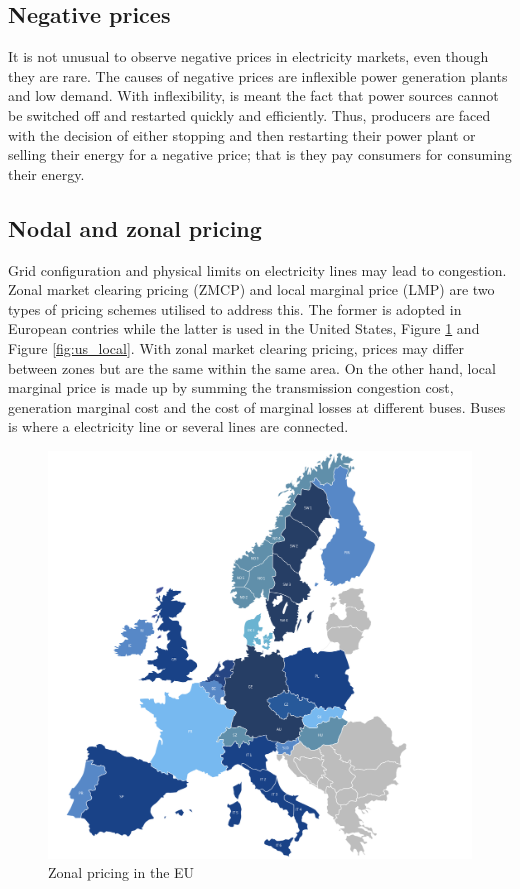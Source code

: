 \subsection{Negative prices}
It is not unusual to observe negative prices in electricity markets, even though they are rare.
The causes of negative prices are inflexible power generation plants and low demand. With inflexibility, is meant the fact that power sources cannot be switched off and restarted quickly and efficiently.
Thus, producers are faced with the decision of either stopping and then restarting their power plant or selling their energy for a negative price; that is they pay consumers for consuming their energy.

\subsection{Nodal and zonal pricing}
Grid configuration and physical limits on electricity lines may lead to congestion. Zonal market clearing pricing (ZMCP) and local marginal price (LMP) are two types of pricing schemes utilised to address this. The former is adopted in European contries while the latter is used in the United States, Figure \ref{fig:eu_zonal} and Figure \ref{fig:us_local}.
With zonal market clearing pricing, prices may differ between zones but are the same within the same area.
On the other hand, local marginal price is made up by summing the transmission congestion cost, generation marginal cost and the cost of marginal losses at different buses. Buses is where a electricity line or several lines are connected.
\begin{figure}[!ht]
    \includegraphics[width=\textwidth]{images/eu_zonal.png}
    \caption[Zonal pricing in the EU]{Zonal pricing in the EU }
    \label{fig:eu_zonal}
\end{figure}


